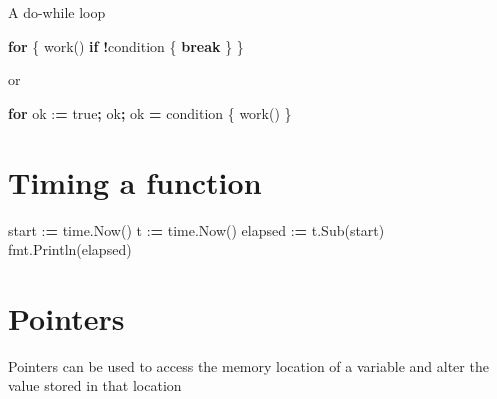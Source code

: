 \documentclass[]{book}
\newenvironment{Shaded}{\begin{snugshade}}{\end{snugshade}}
\newcommand{\ControlFlowTok}[1]{\textcolor[rgb]{0.13,0.29,0.53}{\textbf{#1}}}
\newcommand{\NormalTok}[1]{#1}
\newcommand{\OperatorTok}[1]{\textcolor[rgb]{0.81,0.36,0.00}{\textbf{#1}}}
\begin{document}
A do-while loop

\begin{Shaded}
\begin{Highlighting}[]
\ControlFlowTok{for}\NormalTok{ \{}
\NormalTok{    work()}
    \ControlFlowTok{if} \OperatorTok{!}\NormalTok{condition \{}
        \ControlFlowTok{break}
\NormalTok{    \}}
\NormalTok{\}}
\end{Highlighting}
\end{Shaded}

or

\begin{Shaded}
\begin{Highlighting}[]
\ControlFlowTok{for}\NormalTok{ ok :}\OperatorTok{=}\NormalTok{ true}\OperatorTok{;}\NormalTok{ ok}\OperatorTok{;}\NormalTok{ ok }\OperatorTok{=}\NormalTok{ condition \{}
\NormalTok{    work()}
\NormalTok{\}}
\end{Highlighting}
\end{Shaded}

\hypertarget{timing-a-function}{%
\section{Timing a function}\label{timing-a-function}}

\begin{Shaded}
\begin{Highlighting}[]
\NormalTok{start :}\OperatorTok{=}\NormalTok{ time.Now()}
\NormalTok{t :}\OperatorTok{=}\NormalTok{ time.Now()}
\NormalTok{elapsed :}\OperatorTok{=}\NormalTok{ t.Sub(start)}
\NormalTok{fmt.Println(elapsed)}
\end{Highlighting}
\end{Shaded}

\hypertarget{pointers}{%
\section{Pointers}\label{pointers}}

Pointers can be used to access the memory location of a variable and alter the value stored in that location
\end{document}
